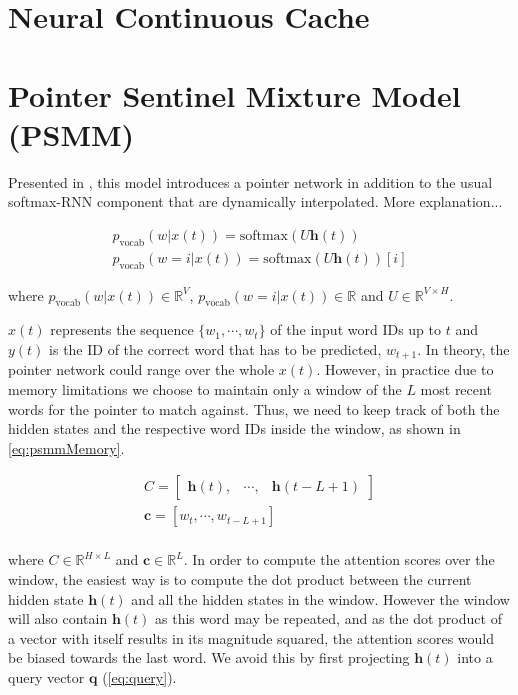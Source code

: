 \section{Neural Continuous Cache}
\label{sec:continuousCache}

\cite{grave2016improving}

\section{Pointer Sentinel Mixture Model (PSMM)}
\label{sec:pointerMixture}

Presented in \cite{merity2016pointer}, this model introduces a pointer network in addition to the usual softmax-RNN component that are dynamically interpolated. More explanation...

\begin{equation} \label{eq:psmmMemory}
	\begin{gathered}
		p_{\text{vocab}}(w|x(t)) = \text{softmax}(U\mathbf{h}(t))  \\
		p_{\text{vocab}}(w=i|x(t)) = \text{softmax}(U\mathbf{h}(t))[i] 
	\end{gathered}	
\end{equation}

where $p_{\text{vocab}}(w|x(t)) \in \mathbb{R}^{V}$, $p_{\text{vocab}}(w=i|x(t)) \in \mathbb{R}$ and $U \in \mathbb{R}^{V \times H}$.

$x(t)$ represents the sequence $\{w_1, \cdots , w_t\}$ of the input word IDs up to $t$  and $y(t)$ is the ID of the correct word that has to be predicted, $w_{t+1}$. In theory, the pointer network could range over the whole $x(t)$. However, in practice due to memory limitations we choose to maintain only a window of the $L$ most recent words for the pointer to match against. Thus, we need to keep track of both the hidden states and the respective word IDs inside the window, as shown in \autoref{eq:psmmMemory}.

\begin{equation}
	\begin{gathered}
		C = \begin{bmatrix} \mathbf{h}(t), & \cdots, & \mathbf{h}(t-L+1) \end{bmatrix} \\
		\mathbf{c} = [w_t, \cdots, w_{t-L+1}] \\
	\end{gathered}
\end{equation}

where $C \in \mathbb{R}^{H \times L}$ and $\mathbf{c} \in \mathbb{R}^{L}$. In order to compute the attention scores over the window, the easiest way is to compute the dot product between the current hidden state $\mathbf{h}(t)$ and all the hidden states in the window. However the window will also contain $\mathbf{h}(t)$ as this word may be repeated, and as the dot product of a vector with itself results in its magnitude squared, the attention scores would be biased towards the last word. We avoid this by first projecting $\mathbf{h}(t)$ into a query vector $\mathbf{q}$ (\autoref{eq:query}).

